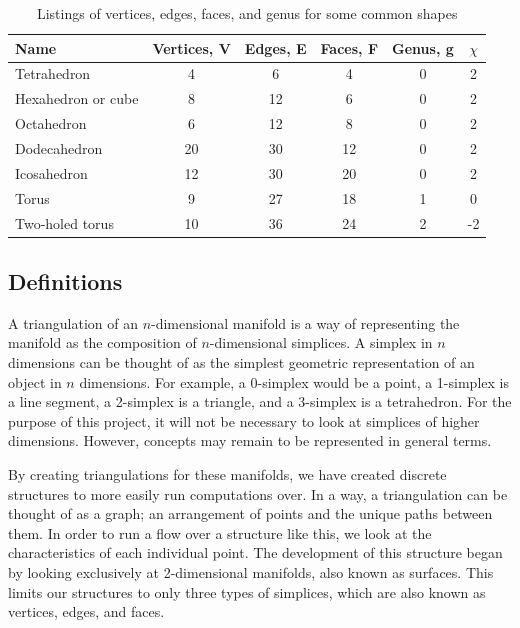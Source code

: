 \documentclass[12pt]{article}
\begin{document}
\begin{table}
\begin{tabular}{lccccc}
Name  &	Vertices, V &	Edges, E & Faces, F &	Genus, g & $\chi$\\
\hline 
Tetrahedron &	4 &	6 &	4 &	0 & 2\\
Hexahedron or cube &	8 &	12 &	6 &	0 &	2\\
Octahedron 	&	6 &	12 &	8 & 0 &	 2\\
Dodecahedron 	&	20 &	30 &	12 &	0&	 2\\
Icosahedron &	12 & 30 & 20 & 0	&	 2\\
Torus & 9 & 27 & 18 &	1 & 0\\
Two-holed torus & 10 & 36 & 24 &	2 & -2\\
\end{tabular}
\caption{Listings of vertices, edges, faces, and genus for some common shapes \cite{wiki}}
\label{EuChar}
\end{table}

\subsection{Definitions}
\maketitle

A triangulation of an $n$-dimensional manifold is a way of representing the manifold as the composition of $n$-dimensional simplices. A simplex in $n$ dimensions can be thought of as the simplest geometric representation of an object in $n$ dimensions. For example, a 0-simplex would be a point, a 1-simplex is a line segment, a 2-simplex is a triangle, and a 3-simplex is a tetrahedron. For the purpose of this project, it will not be necessary to look at simplices of higher dimensions. However, concepts may remain to be represented in general terms.\newline

\noindent By creating triangulations for these manifolds, we have created discrete structures to more easily run computations over. In a way, a triangulation can be thought of as a graph; an arrangement of points and the unique paths between them. In order to run a flow over a structure like this, we look at the characteristics of each individual point. The development of this structure began by looking exclusively at 2-dimensional manifolds, also known as surfaces. This limits our structures to only three types of simplices, which are also known as vertices, edges, and faces. \newline
\end{document}
